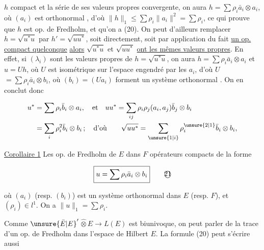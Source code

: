$h$ compact et la série  de ses valeurs propres convergente, on aura
$h=\sum\rho_i\bar a_i\otimes a_i$, où $(a_i)$ est orthonormal , d'où
$\|h\|_1\leq\sum\rho_i\|a_i\|^2=\sum\rho_i$, ce qui prouve que $h$ est op. de
Fredholm, et qu'on a (20). On peut d'ailleurs remplacer
 $h=\sqrt{u^*u}$ par $h'=\sqrt{uu^*}$,  soit
directement, soit par application du fait   
 \uline{un op. compact quelconque}  \uline{alors} $\sqrt{u^*u}$ et $\sqrt{uu^*}$
\uline{ont les mêmes valeurs propres}. En effet, si $(\lambda_i)$ sont
les valeurs propres de $h=\sqrt{u^*u}$, on aura $h=\sum\rho_i\bar a_i\otimes a_i$
et $u=Uh$, où $U$ est isométrique sur l'espace engendré
par les $a_i$, d'où $U$$=\sum\rho_i\bar a_i\otimes b_i$, où $(b_i)=(Ua_i)$
forment un système orthonormal . On en conclut donc

\[
\begin{aligned}
u^*&=\sum\rho_i\bar b_i\otimes a_i,\quad\text{et}\quad uu^*=\sum_{ij}\rho_i\rho_j(a_i,a_j)\bar b_j\otimes b_i\\
&=\sum_i\rho_i^2\bar b_i\otimes b_i\,;\quad\text{d'où}\qquad
\sqrt{uu^*}=\sum_{\unsure{1|i}}\rho_i^{\unsure{2|1}}\bar b_i\otimes b_i,
\end{aligned}
\]

\uline{Corollaire 1} Les op. de Fredholm de $E$ dans $F$  
opérateurs compacts de la forme

\[
\boxed{u=\sum\rho_i\bar a_i\otimes b_i} \tag*{\textcircled{21}}
\]

où $(a_i)$ (resp. $(b_i)$) est un système orthonormal
dans $E$ (resp. $F$), et $(\rho_i)\in l^1$. On a $\|u\|_1=\sum\rho_i$.


Comme $\unsure{\bar E|E}'$$\widehat\otimes E\to L(E)$ est biunivoque, on peut parler
de la trace d'un op. de Fredholm dans l'espace de Hilbert $E$.
 La formule (20) peut s'écrire aussi

